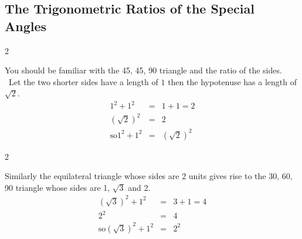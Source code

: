 \subsection{The Trigonometric Ratios of the Special Angles}
\columnsep =30pt
\begin {multicols}{2}
 

   
\setlength\fboxrule{0in}\setlength\fboxsep{0.2in}


You should be familiar with the 45, 45, 90 triangle and the ratio of the sides. \ Let
the two shorter sides have a length of $1$ then the hypotenuse has a length of $\sqrt{2}$. \\\relax
\begin{align*}1^{2} +1^{2} &  = & 1 +1 =2 \\
\left (\sqrt{2}\right )^{2} &  = & 2 \\
\text{so}1^{2} +1^{2} &  = & \left (\sqrt{2}\right )^{2}\end{align*}


\end {multicols}



\columnsep =30pt
\begin {multicols}{2}
 

   
\setlength\fboxrule{0in}\setlength\fboxsep{0.2in}


Similarly the equilateral triangle whose sides are 2 units gives rise to the 30, 60, 90 triangle whose sides are 1, $\sqrt{3}$ and 2. \\\relax
\begin{align*}\left (\sqrt{3}\right )^{2} +1^{2} &  = & 3 +1 =4 \\
2^{2} &  = & 4 \\
\text{so}\left (\sqrt{3}\right )^{2} +1^{2} &  = & 2^{2}\end{align*}


\end {multicols}


